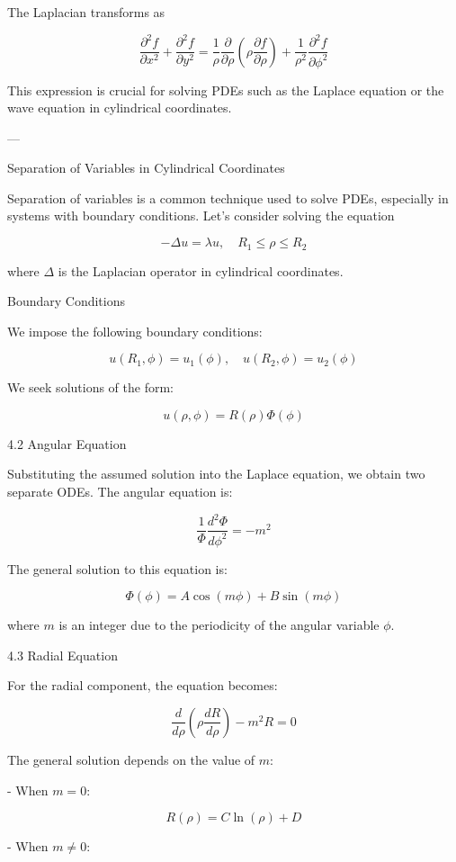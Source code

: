 The Laplacian transforms as

\[
\frac{\partial^2 f}{\partial x^2} + \frac{\partial^2 f}{\partial y^2} = \frac{1}{\rho} \frac{\partial}{\partial \rho} \left( \rho \frac{\partial f}{\partial \rho} \right) + \frac{1}{\rho^2} \frac{\partial^2 f}{\partial \phi^2}
\]

This expression is crucial for solving PDEs such as the Laplace equation or the wave equation in cylindrical coordinates.

---

Separation of Variables in Cylindrical Coordinates

Separation of variables is a common technique used to solve PDEs, especially in systems with boundary conditions. Let's consider solving the equation

\[
-\Delta u = \lambda u, \quad R_1 \leq \rho \leq R_2
\]

where \( \Delta \) is the Laplacian operator in cylindrical coordinates.

Boundary Conditions

We impose the following boundary conditions:

\[
u(R_1, \phi) = u_1(\phi), \quad u(R_2, \phi) = u_2(\phi)
\]

We seek solutions of the form:

\[
u(\rho, \phi) = R(\rho) \Phi(\phi)
\]

4.2 Angular Equation

Substituting the assumed solution into the Laplace equation, we obtain two separate ODEs. The angular equation is:

\[
\frac{1}{\Phi} \frac{d^2 \Phi}{d \phi^2} = -m^2
\]

The general solution to this equation is:

\[
\Phi(\phi) = A \cos(m \phi) + B \sin(m \phi)
\]

where \( m \) is an integer due to the periodicity of the angular variable \( \phi \).

4.3 Radial Equation

For the radial component, the equation becomes:

\[
\frac{d}{d \rho} \left( \rho \frac{dR}{d \rho} \right) - m^2 R = 0
\]

The general solution depends on the value of \(m\):

- When \( m = 0 \):

\[
R(\rho) = C \ln(\rho) + D
\]

- When \( m \neq 0 \):

